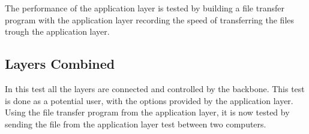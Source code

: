 The performance of the application layer is tested by building a file transfer program with the application layer recording the speed of transferring the files trough the application layer.

\subsection{Layers Combined}

In this test all the layers are connected and controlled by the backbone. This test is done as a potential user, with the options provided by the application layer. Using the file transfer program from the application layer, it is now tested by sending the file from the application layer test between two computers. 

